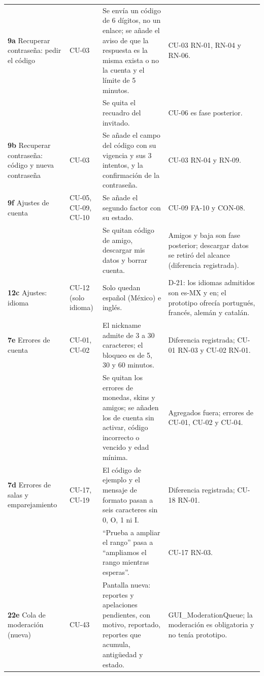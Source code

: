 \begin{center}
\begin{longtable}{|L{0.1\textwidth}|L{0.13\textwidth}|L{0.335\textwidth}|L{0.32\textwidth}|}
\textbf{9a} Recuperar contraseña: pedir el código & \mbox{CU-03} & Se envía un código de 6 dígitos, no un enlace; se añade el aviso de que la respuesta es la misma exista o no la cuenta y el límite de 5 minutos. & \mbox{CU-03} \mbox{RN-01}, \mbox{RN-04} y \mbox{RN-06}. \\ 
 &  & Se quita el recuadro del invitado. & \mbox{CU-06} es fase posterior. \\ \hline
\textbf{9b} Recuperar contraseña: código y nueva contraseña & \mbox{CU-03} & Se añade el campo del código con su vigencia y sus 3 intentos, y la confirmación de la contraseña. & \mbox{CU-03} \mbox{RN-04} y \mbox{RN-09}. \\ \hline
\textbf{9f} Ajustes de cuenta & \mbox{CU-05}, \mbox{CU-09}, \mbox{CU-10} & Se añade el segundo factor con su estado. & \mbox{CU-09} \mbox{FA-10} y \mbox{CON-08}. \\ 
 &  & Se quitan código de amigo, descargar mis datos y borrar cuenta. & Amigos y baja son fase posterior; descargar datos se retiró del alcance (diferencia registrada). \\ \hline
\textbf{12c} Ajustes: idioma & \mbox{CU-12} (solo idioma) & Solo quedan español (México) e inglés. & \mbox{D-21}: los idiomas admitidos son es-MX y en; el prototipo ofrecía portugués, francés, alemán y catalán. \\ \hline
\textbf{7e} Errores de cuenta & \mbox{CU-01}, \mbox{CU-02} & El nickname admite de 3 a 30 caracteres; el bloqueo es de 5, 30 y 60 minutos. & Diferencia registrada; \mbox{CU-01} \mbox{RN-03} y \mbox{CU-02} \mbox{RN-01}. \\ 
 &  & Se quitan los errores de monedas, skins y amigos; se añaden los de cuenta sin activar, código incorrecto o vencido y edad mínima. & Agregados fuera; errores de \mbox{CU-01}, \mbox{CU-02} y \mbox{CU-04}. \\ \hline
\textbf{7d} Errores de salas y emparejamiento & \mbox{CU-17}, \mbox{CU-19} & El código de ejemplo y el mensaje de formato pasan a seis caracteres sin 0, O, 1 ni I. & Diferencia registrada; \mbox{CU-18} \mbox{RN-01}. \\ 
 &  & ``Prueba a ampliar el rango'' pasa a ``ampliamos el rango mientras esperas''. & \mbox{CU-17} \mbox{RN-03}. \\ \hline
\textbf{22e} Cola de moderación (nueva) & \mbox{CU-43} & Pantalla nueva: reportes y apelaciones pendientes, con motivo, reportado, reportes que acumula, antigüedad y estado. & GUI\_ModerationQueue; la moderación es obligatoria y no tenía prototipo. \\ \hline

\end{longtable}
\end{center}
